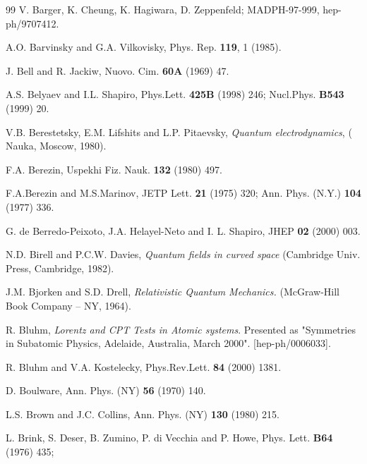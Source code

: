\begin{thebibliography}{99}
V. Barger, K. Cheung, K. Hagiwara, D. Zeppenfeld;
MADPH-97-999, hep-ph/9707412.

A.O. Barvinsky and G.A. Vilkovisky,
Phys. Rep. {\bf 119}, 1 (1985).

J. Bell and R. Jackiw, Nuovo. Cim. {\bf 60A} (1969) 47.

A.S. Belyaev and I.L. Shapiro,
Phys.Lett.  {\bf 425B} (1998) 246;
Nucl.Phys. {\bf B543} (1999) 20.

V.B. Berestetsky, E.M. Lifshits and L.P. Pitaevsky,
{\sl Quantum electrodynamics}, ( Nauka, Moscow, 1980).

F.A. Berezin, Uspekhi Fiz. Nauk. {\bf 132} (1980) 497.

F.A.Berezin and M.S.Marinov,
JETP Lett. {\bf 21} (1975) 320; Ann. Phys. (N.Y.) {\bf 104} (1977) 336. 

    G. de Berredo-Peixoto,
J.A. Helayel-Neto and  I. L. Shapiro, JHEP {\bf 02} (2000) 003.

 N.D. Birell and P.C.W. Davies, {\sl Quantum fields
in curved space} (Cambridge Univ. Press, Cambridge, 1982).

 J.M. Bjorken and S.D. Drell,
{\sl Relativistic Quantum Mechanics.} (McGraw-Hill Book Company
-- NY, 1964).

R. Bluhm, {\sl Lorentz and CPT Tests in Atomic
systems}. Presented as "Symmetries in Subatomic Physics, Adelaide,
Australia, March 2000". [hep-ph/0006033].

  R. Bluhm and V.A. Kostelecky, 
Phys.Rev.Lett. {\bf 84} (2000) 1381. %

D. Boulware, Ann. Phys. (NY) {\bf 56} (1970) 140. %

 L.S. Brown and J.C. Collins,
Ann. Phys. (NY) {\bf 130} (1980) 215.

 L. Brink, S. Deser, B. Zumino, P. di Vecchia and P. Howe, Phys.
 Lett. {\bf B64} (1976) 435;


\end{thebibliography}
